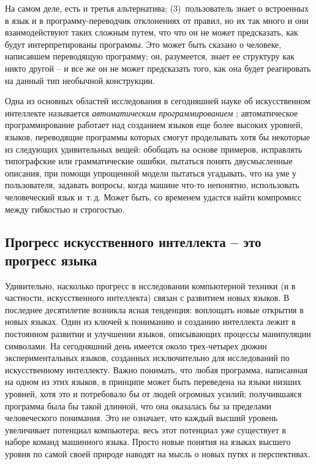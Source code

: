 \documentclass[../main.tex]{subfiles}
\begin{document}
На самом деле, есть и третья альтернатива; (3)~пользователь знает о встроенных в язык и в программу-переводчик отклонениях от правил, но их так много и они взаимодействуют таких сложным путем, что что он не может предсказать, как будут интерпретированы программы. Это может быть сказано о человеке, написавшем переводящую программу; он, разумеется, знает ее структуру как никто другой \--- и все же он не может предсказать того, как она будет реагировать на данный тип необычной конструкции.

Одна из основных областей исследования в сегодняшней науке об искусственном интеллекте называется \emph{автоматическим программированием} ; автоматическое программирование работает над созданием языков еще более высоких уровней, языков, переводящие программы которых смогут проделывать хотя бы некоторые из следующих удивительных вещей: обобщать на основе примеров, исправлять типографские или грамматические ошибки, пытаться понять двусмысленные описания, при помощи упрощенной модели пытаться угадывать, что на уме у пользователя, задавать вопросы, когда машине что-то непонятно, использовать человеческий язык и~т.\,д. Может быть, со временем удастся найти компромисс между гибкостью и строгостью.


\subsection{Прогресс искусственного интеллекта \--- это прогресс языка}

Удивительно, насколько прогресс в исследовании компьютерной техники (и в частности, искусственного интеллекта) связан с развитием новых языков. В последнее десятилетие возникла ясная тенденция: воплощать новые открытия в новых языках. Один из ключей к пониманию и созданию интеллекта лежит в постоянном развитии и улучшении языков, описывающих процессы манипуляции символами. На сегодняшний день имеется около трех-четырех дюжин экспериментальных языков, созданных исключительно для исследований по искусственному интеллекту. Важно понимать, что любая программа, написанная на одном из этих языков, в принципе может быть переведена на языки низших уровней, хотя это и потребовало бы от людей огромных усилий; получившаяся программа была бы такой длинной, что она оказалась бы за пределами человеческого понимания. Это не означает, что каждый высший уровень увеличивает потенциал компьютера; весь этот потенциал уже существует в наборе команд машинного языка. Просто новые понятия на языках высшего уровня по самой своей природе наводят на мысль о новых путях и перспективах.
\end{document}
